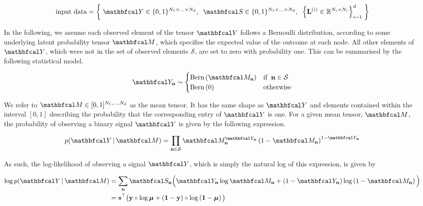 \begin{equation*}
    \text{input data} = \left\{\; \Yt \in \{0, 1\}^{N_1 \times ... \times N_d}, \;\; \St \in \{0, 1\}^{N_1 \times ... \times N_d} , \;\; \left\{\LL^{(i)} \in \R^{N_i \times N_i}\right\}_{i=1}^d \; \right\}
\end{equation*}

In the following, we assume each observed element of the tensor $\Yt$ follows a Bernoulli distribution, according to some underlying latent probability tensor $\Mt$, which specifies the expected value of the outcome at each node. All other elements of $\Yt$, which were not in the set of observed elements $\mathcal{S}$, are set to zero with probability one. This can be summarised by the following statistical model. 

\begin{equation}
    \label{eq:lgsr_bern} 
    \Yt_\nn \sim  \begin{cases}
        \text{Bern}\left(\Mt_\nn \right) & \text{if} \;\; \nn \in \mathcal{S} \\
        \text{Bern}\left(0\right) & \text{otherwise}
    \end{cases}
\end{equation}


We refer to $\Mt \in [0, 1]^{N_1, ..., N_d}$ as the mean tensor. It has the same shape as $\Yt$ and elements contained within the interval $[0, 1]$ describing the probability that the corresponding entry of $\Yt$ is one. For a given mean tensor, $\Mt$, the probability of observing a binary signal $\Yt$ is given by the following expression. 

\begin{equation}
    \label{eq:lgsr_prob}
    p(\Yt \, | \, \Mt) = \prod_{\nn \in \mathcal{S}} \Mt_\nn^{\Yt_\nn}\left(1 - \Mt_\nn\right)^{1 - \Yt_\nn}
\end{equation}

As such, the log-likelihood of observing a signal $\Yt$, which is simply the natural log of this expression, is given by 

\begin{align}
    \label{eq:lgsr_logprob}
   \log p(\Yt \, | \, \Mt) &= \sum_{\nn} \St_{\nn} \Big( \Yt_{\nn} \log \Mt_{\nn} + (1 - \Yt_{\nn}) \log \left(1 - \Mt_{\nn}\right) \Big) \notag \\
   &= \s^\top \big(\y \circ \log \muu + \left(\one  - \y\right) \circ \log \left(\one - \muu \right)\big) 
\end{align}

